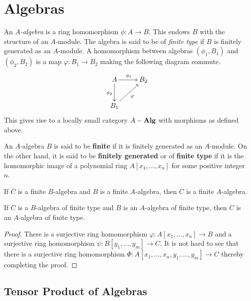 \section{Algebras}

\begin{definition}
    An \textit{$A$-algebra} is a ring homomorphism $\phi: A\to B$. This endows $B$ with the structure of an $A$-module. The algebra is said to be of \textit{finite type} if $B$ is finitely generated as an $A$-module. A homomorphism between algebras $(\phi_1,B_1)$ and $(\phi_2,B_2)$ is a map $\varphi: B_1\to B_2$ making the following diagram commute.
    \begin{equation*}
        \xymatrix{
            A\ar[r]^{\phi_1}\ar[d]_{\phi_2} & B_2\\
            B_1\ar[ru]_{\varphi}
        }
    \end{equation*}
    This gives rise to a locally small category $A-\mathbf{Alg}$ with morphisms as defined above.
\end{definition}

An $A$-algebra $B$ is said to be \textbf{finite} if it is finitely generated as an $A$-module. On the other hand, it is said to be \textbf{finitely generated} or of \textbf{finite type} if it is the homomorphic image of a polynomial ring $A[x_1,\ldots,x_n]$ for some positive integer $n$.

\begin{proposition}
    If $C$ is a finite $B$-algebra and $B$ is a finite $A$-algebra, then $C$ is a finite $A$-algebra.
\end{proposition}

\begin{proposition}
    If $C$ is a $B$-algebra of finite type and $B$ is an $A$-algebra of finite type, then $C$ is an $A$-algebra of finite type.
\end{proposition}
\begin{proof}
    There is a surjective ring homomorphism $\varphi: A[x_1,\ldots,x_n]\to B$ and a surjective ring homomorphism $\psi: B[y_1,\ldots,y_m]\to C$. It is not hard to see that there is a surjective ring homomorphism $\Phi: A[x_1,\ldots,x_n,y_1,\ldots,y_m]\to C$ thereby completing the proof.
\end{proof}

\subsection{Tensor Product of Algebras}

